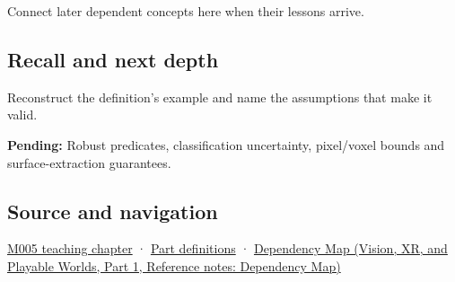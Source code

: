 \hypertarget{appendix-c80db39080be-used-by}{}

Connect later dependent concepts here when their lessons arrive.

\subsection{Recall and next depth}\label{appendix-c80db39080be-recall-and-next-depth}

\hypertarget{appendix-c80db39080be-recall-and-next-depth}{}

Reconstruct the definition's example and name the assumptions that make it valid.

\textbf{Pending:} Robust predicates, classification uncertainty, pixel/voxel bounds and surface-extraction guarantees.

\subsection{Source and navigation}\label{appendix-c80db39080be-source-and-navigation}

\hypertarget{appendix-c80db39080be-source-and-navigation}{}

\hyperref[01-foundations-i-ch001-when-arithmetic-meets-uncertainty]{M005 teaching chapter} · \hyperref[appendix-fd090d982a15-m005---parts-77-88]{Part definitions} · \href{../07-Vision-XR-and-Playable-Worlds-P01/main.pdf\#appendix-4ad47bdd269a}{Dependency Map (Vision, XR, and Playable Worlds, Part 1, Reference notes: Dependency Map)}
